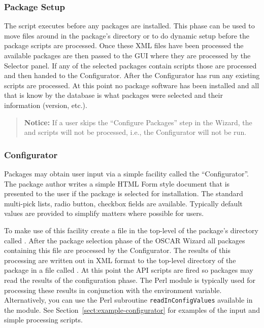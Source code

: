 \subsubsection{Package Setup}

The  script executes before any packages are installed.  This
phase can be used to move files around in the package's directory or to do
dynamic setup before the package  scripts are processed.
Once these XML files have been processed the available packages are then
passed to the GUI where they are processed by the Selector panel.  If any
of the selected packages contain  scripts those are
processed and then handed to the Configurator.  After the Configurator has
run any existing  scripts are processed.  At this
point no package software has been installed and all that is know by the
database is what packages were selected and their 
information (version, etc.).

\begin{verse}
   {\bfseries Notice: } If a user skips the ``Configure Packages'' step in
   the Wizard, the  and  scripts
   will not be processed, i.e., the Configurator will not be run. 
\end{verse}




\subsubsection{Configurator}
\label{sect:pkg-configurator}

Packages may obtain user input via a simple facility called the
``Configurator''.  The package author writes a simple HTML Form style
document that is presented to the user if the package is selected for
installation.  The standard multi-pick lists, radio button, checkbox fields
are available.  Typically default values are provided to simplify matters
where possible for users.  

To make use of this facility create a file in the top-level of the
package's directory called .  After the package
selection phase of the OSCAR Wizard all packages containing this file are
processed by the Configurator.  The results of this processing are written
out in XML format to the top-level directory of the package in a file
called .  At this point the
 API scripts are fired so packages may read the
results of the configuration phase.    The Perl  module
is typically used for processing these results in conjunction with the
 environment variable.  Alternatively, you can
use the Perl subroutine \texttt{readInConfigValues} available in the
 module.  See Section~\ref{sect:example-configurator}
for examples of the input and simple processing scripts.

